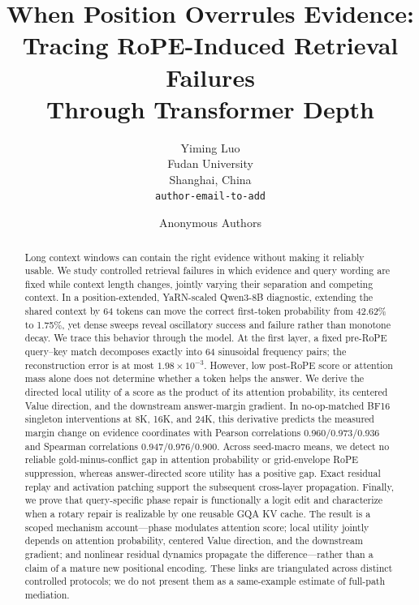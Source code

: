 \documentclass{article}
\title{When Position Overrules Evidence:\\
Tracing RoPE-Induced Retrieval Failures\\
Through Transformer Depth}
\author{Yiming Luo\\
  Fudan University\\
  Shanghai, China\\
  \texttt{author-email-to-add}}
\author{Anonymous Authors}
\begin{document}
\maketitle

\begin{abstract}
Long context windows can contain the right evidence without making it reliably
usable.  We study controlled retrieval failures in which evidence and query
wording are fixed while context length changes, jointly varying their separation
and competing context.  In a position-extended,
YaRN-scaled Qwen3-8B diagnostic, extending the shared context by 64 tokens can move the correct
first-token probability from 42.62\% to 1.75\%, yet dense sweeps reveal
oscillatory success and failure rather than monotone decay.  We trace this
behavior through the model.  At the first layer,
a fixed pre-RoPE query--key match decomposes exactly into 64 sinusoidal frequency
pairs; the reconstruction error is at most $1.98\times10^{-3}$.  However, low
post-RoPE score or attention mass alone does not determine whether a token helps
the answer.  We derive the directed local utility of a score as the product of
its attention probability, its centered Value direction, and the downstream
answer-margin gradient.  In no-op-matched BF16 singleton interventions at 8K,
16K, and 24K, this derivative predicts the measured margin change on evidence
coordinates with Pearson correlations 0.960/0.973/0.936 and Spearman
correlations 0.947/0.976/0.900.  Across seed-macro means, we detect no reliable
gold-minus-conflict gap in attention probability or grid-envelope RoPE
suppression, whereas answer-directed score utility has a positive gap.  Exact residual
replay and activation patching support the subsequent cross-layer propagation.
Finally, we prove
that query-specific phase repair is functionally a logit edit and characterize
when a rotary repair is realizable by one reusable GQA KV cache.  The result is
a scoped mechanism account---phase modulates attention score; local utility
jointly depends on attention probability, centered Value direction, and the
downstream gradient; and nonlinear residual dynamics propagate the
difference---rather than a claim of a mature new positional encoding.
These links are triangulated across distinct controlled protocols; we do not
present them as a same-example estimate of full-path mediation.
\end{abstract}








\end{document}
